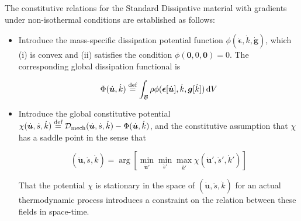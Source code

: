 The constitutive relations for the Standard Dissipative material with gradients under non-isothermal conditions are established as follows:
\begin{itemize}
    \item Introduce the mass-specific dissipation potential function $\phi(\dot{\bm{\epsilon}},\dot{k},\dot{\bm{g}})$, which (i) is convex and (ii) satisfies the condition $\phi(\bm{0},0,\bm{0})=0$. The corresponding global dissipation functional is

 $$ \Phi(\dot{\bm{u}},\dot{k}) \stackrel{\text{def}}{=} \int_{\mathcal{B}} \rho\phi(\bm{\epsilon}[\dot{\bm{u}}],\dot{k},\bm{g}[\dot{k}]) \mathop{}\!\mathrm{d} V $$

    \item Introduce the global constitutive potential $\chi(\dot{\bm{u}},\dot{s},\dot{k})\stackrel{\text{def}}{=} {\mathcal D}_{\mathrm{mech}}(\dot{\bm{u}},\dot{s},\dot{k})-\Phi(\dot{\bm{u}},\dot{k})$, and the constitutive assumption that $\chi$ has a saddle point in the sense that

 $$ (\dot{\bm{u}},\dot{s},\dot{k}) = \arg\left[\min_{\dot{\bm{u}}'}\min_{\dot{s}'}\max_{\dot{k}'} \chi(\dot{\bm{u}}',\dot{s}',\dot{k}') \right]$$

        That the potential $\chi$ is stationary in the space of $(\dot{\bm{u}},\dot{s},\dot{k})$ for an actual thermodynamic process introduces a constraint on the relation between these fields in space-time.
\end{itemize}

